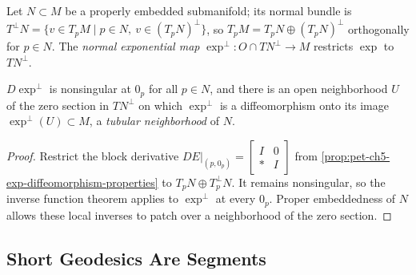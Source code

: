 \begin{definition}
  \label{def:pet-ch5-normal-exponential-map}
  \leanok
  Let $N\subset M$ be a properly embedded submanifold; its normal bundle is
  $T^\perp N=\{v\in T_pM\mid p\in N,\ v\in(T_pN)^\perp\}$, so $T_pM=T_pN\oplus
  (T_pN)^\perp$ orthogonally for $p\in N$. The \emph{normal exponential map}
  $\exp^\perp:O\cap TN^\perp\to M$ restricts $\exp$ to $TN^\perp$.
\end{definition}

\begin{corollary}
  \label{cor:pet-ch5-tubular-neighborhood}
  $D\exp^\perp$ is nonsingular at $0_p$ for all $p\in N$, and there is an open
  neighborhood $U$ of the zero section in $TN^\perp$ on which $\exp^\perp$ is a
  diffeomorphism onto its image $\exp^\perp(U)\subset M$, a \emph{tubular
  neighborhood} of $N$.
\end{corollary}
\begin{proof}
  \sketch
  Restrict the block derivative
  $DE|_{(p,0_p)}=\begin{bmatrix}I&0\\ *&I\end{bmatrix}$ from
  \cref{prop:pet-ch5-exp-diffeomorphism-properties} to
  $T_pN\oplus T_p^\perp N$.  It remains nonsingular, so the inverse function
  theorem applies to $\exp^\perp$ at every $0_p$.  Proper embeddedness of $N$
  allows these local inverses to patch over a neighborhood of the zero section.
\end{proof}

\subsection{Short Geodesics Are Segments}

